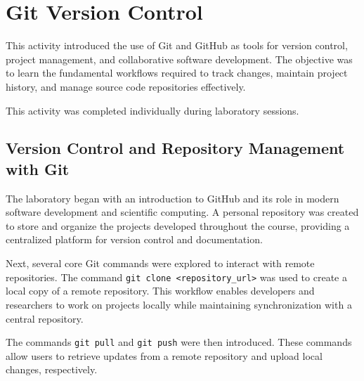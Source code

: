 \documentclass[../portafolio.tex]{subfiles}
\begin{document}
\section{Git Version Control}  


\medskip


This activity introduced the use of Git and GitHub as tools for version control, project management, and collaborative software development. The objective was to learn the fundamental workflows required to track changes, maintain project history, and manage source code repositories effectively.


This activity was completed individually during laboratory sessions.


\subsection{Version Control and Repository Management with Git}

The laboratory began with an introduction to GitHub and its role in modern software development and scientific computing. A personal repository was created to store and organize the projects developed throughout the course, providing a centralized platform for version control and documentation.

Next, several core Git commands were explored to interact with remote repositories. The command \verb|git clone <repository_url>| was used to create a local copy of a remote repository. This workflow enables developers and researchers to work on projects locally while maintaining synchronization with a central repository.

The commands \verb|git pull| and \verb|git push| were then introduced. These commands allow users to retrieve updates from a remote repository and upload local changes, respectively.
\end{document}
